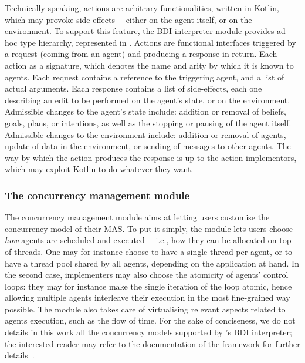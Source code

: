 Technically speaking, actions are arbitrary functionalities, written in Kotlin, which may provoke side-effects%
---either on the agent itself, or on the environment.
%
To support this feature, the \ac{BDI} interpreter module provides ad-hoc type hierarchy, represented in .
%
Actions are functional interfaces triggered by a request (coming from an agent) and producing a response in return.
%
Each action as a signature, which denotes the name and arity by which it is known to agents.
%
Each request contains a reference to the triggering agent, and a list of actual arguments.
%
Each response contains a list of side-effects, each one describing an edit to be performed on the agent's state, or on the environment.
%
Admissible changes to the agent's state include: addition or removal of beliefs, goals, plans, or intentions, as well as the stopping or pausing of the agent itself.
%
Admissible changes to the environment include: addition or removal of agents, update of data in the environment, or sending of messages to other agents.
%
The way by which the action produces the response is up to the action implementors,
which may exploit Kotlin to do whatever they want.



\subsubsection{The concurrency management module}
\label{sec:concurrency-module}

The concurrency management module aims at letting users customise the concurrency model of their \ac{MAS}.
%
To put it simply, the module lets users choose \emph{how} agents are scheduled and executed%
---i.e., how they can be allocated on top of threads.
%
One may for instance choose to have a single thread per agent, or to have a thread pool shared by all agents,
depending on the application at hand.
%
In the second case, implementers may also choose the atomicity of agents' control loops:
they may for instance make the single iteration of the loop atomic,
hence allowing multiple agents interleave their execution in the most fine-grained way possible.
%
The module also takes care of virtualising relevant aspects related to agents execution, such as the flow of time.
%
For the sake of conciseness,
we do not details in this work all the concurrency models supported by \jakta{}'s \ac{BDI} interpreter;
the interested reader may refer to the documentation of the framework for further details~\cite{Baiardi2023}.

